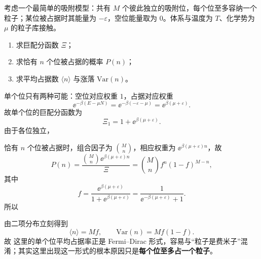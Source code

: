 \begin{question}[16分]
考虑一个最简单的吸附模型：共有 $M$ 个彼此独立的吸附位，每个位至多容纳一个粒子；某位被占据时其能量为 $-\varepsilon$，空位能量取为 $0$。体系与温度为 $T$、化学势为 $\mu$ 的粒子库接触。
\begin{enumerate}[label=(\arabic*),leftmargin=2.8em,itemsep=0.2em]
\item 求巨配分函数 $\Xi$；
\item 求恰有 $n$ 个位被占据的概率 $P(n)$；
\item 求平均占据数 $\langle n\rangle$ 与涨落 $\mathrm{Var}(n)$。
\end{enumerate}
\begin{solution}

单个位只有两种可能：空位对应权重 $1$，占据对应权重
\[
\ee^{-\beta(E-\mu N)}=\ee^{-\beta(-\varepsilon-\mu)}=\ee^{\beta(\mu+\varepsilon)}.
\]
故单个位的巨配分函数为
\[
\Xi_1=1+\ee^{\beta(\mu+\varepsilon)}.
\]
由于各位独立，

恰有 $n$ 个位被占据时，组合因子为 $\binom{M}{n}$，相应权重为 $\ee^{\beta(\mu+\varepsilon)n}$，故
\[
P(n)=\frac{\binom{M}{n}\ee^{\beta(\mu+\varepsilon)n}}{\Xi}
=\binom{M}{n}f^n(1-f)^{M-n},
\]
其中
\[
f=\frac{\ee^{\beta(\mu+\varepsilon)}}{1+\ee^{\beta(\mu+\varepsilon)}}
=\frac{1}{\ee^{-\beta(\mu+\varepsilon)}+1}.
\]
所以

由二项分布立刻得到
\[
\langle n\rangle=Mf,\qquad
\mathrm{Var}(n)=Mf(1-f).
\]
故
这里的单个位平均占据率正是 Fermi--Dirac 形式，容易与“粒子是费米子”混淆；其实这里出现这一形式的根本原因只是\textbf{每个位至多占一个粒子}。
\end{solution}
\end{question}


